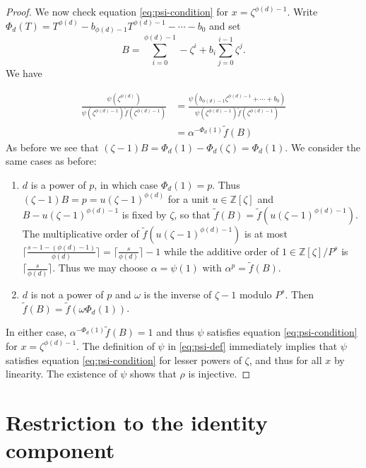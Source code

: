 \documentclass[11pt]{amsart}
\theoremstyle{plain}
\theoremstyle{definition}
\theoremstyle{remark}
\newcommand{\ZZ}{{\mathbb{Z}}}
\begin{document}
\begin{proof}
  We now check equation \ref{eq:psi-condition} for
  $x = \zeta^{\phi(d)-1}$.  Write
  $\Phi_d(T) = T^{\phi(d)} - b_{\phi(d)-1}T^{\phi(d)-1} - \cdots - b_0$
  and set
  $$B = \sum_{i=0}^{\phi(d)-1} -\zeta^i + b_i \sum_{j=0}^{i-1} \zeta^j.$$
  We have

  \begin{align*}
    \frac{\psi(\zeta^{\phi(d)})}{\psi(\zeta^{\phi(d)-1})\tilde{f}(\zeta^{\phi(d)-1})}
    &= \frac{\psi(b_{\phi(d)-1}\zeta^{\phi(d)-1} + \cdots + b_0)}{\psi(\zeta^{\phi(d)-1})\tilde{f}(\zeta^{\phi(d)-1})} \\
    &= \alpha^{-\Phi_d(1)} \tilde{f}(B)
  \end{align*}
  As before we see that $(\zeta - 1)B = \Phi_d(1) - \Phi_d(\zeta) = \Phi_d(1)$.
  We consider the same cases as before:

  \begin{enumerate}
  \item $d$ is a power of $p$, in which case $\Phi_d(1) = p$.  Thus
    $(\zeta-1)B = p = u(\zeta-1)^{\phi(d)}$ for a unit $u \in \ZZ[\zeta]$
    and $B - u(\zeta-1)^{\phi(d)-1}$ is fixed by $\zeta$,
    so that $\tilde{f}(B) = \tilde{f}(u(\zeta - 1)^{\phi(d)-1})$.  The
    multiplicative order of $\tilde{f}(u(\zeta-1)^{\phi(d)-1})$ is at most
    $\lceil \frac{s - 1 - (\phi(d)-1)}{\phi(d)}\rceil = \lceil \frac{s}{\phi(d)} \rceil - 1$
    while the additive order of $1 \in \ZZ[\zeta]/P^s$ is $\lceil \frac{s}{\phi(d)} \rceil$.
    Thus we may choose $\alpha = \psi(1)$ with $\alpha^p = \tilde{f}(B)$.
  \item $d$ is not a power of $p$ and $\omega$ is the inverse of
    $\zeta-1$ modulo $P^s$.  Then $\tilde{f}(B) = \tilde{f}(\omega\Phi_d(1))$.
  \end{enumerate}
  In either case, $\alpha^{-\Phi_d(1)}\tilde{f}(B) = 1$ and thus
  $\psi$ satisfies equation \ref{eq:psi-condition} for
  $x = \zeta^{\phi(d)-1}$.  The definition of $\psi$ in \ref{eq:psi-def}
  immediately implies that $\psi$ satisfies equation
  \ref{eq:psi-condition} for lesser powers of $\zeta$, and thus for
  all $x$ by linearity.  The existence of $\psi$ shows that $\rho$ is injective.
\end{proof}

\section{Restriction to the identity component}

%
\end{document}
